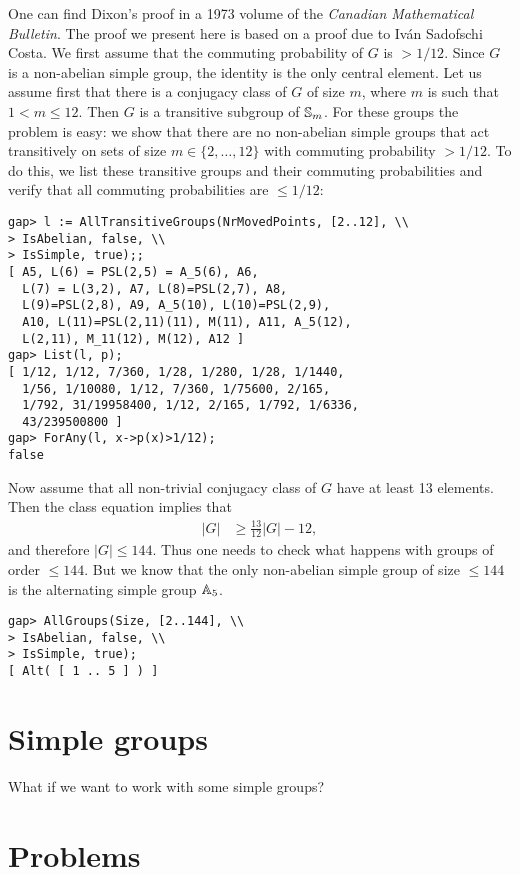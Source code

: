 One can find Dixon's proof in a 1973 volume of the \emph{Canadian Mathematical
Bulletin}. The proof we present here is based on a proof due to Iv\'an Sadofschi
Costa. We first assume that the commuting probability of $G$ is $>1/12$. Since
$G$ is a non-abelian simple group, the identity is the only central element. 
Let us assume first that there is a conjugacy class of $G$ of size $m$, where
$m$ is such that $1<m\leq 12$. Then $G$ is a transitive subgroup of $\mathbb{S}_m$.
For these groups the problem is easy: we show that there are no non-abelian simple groups
that act transitively on sets of size $m\in\{2,\dots,12\}$ with commuting
probability $>1/12$. To do this, we list these transitive groups and their commuting
probabilities and verify that all commuting probabilities are $\leq
1/12$:
\begin{lstlisting}
gap> l := AllTransitiveGroups(NrMovedPoints, [2..12], \\
> IsAbelian, false, \\
> IsSimple, true);;
[ A5, L(6) = PSL(2,5) = A_5(6), A6, 
  L(7) = L(3,2), A7, L(8)=PSL(2,7), A8, 
  L(9)=PSL(2,8), A9, A_5(10), L(10)=PSL(2,9), 
  A10, L(11)=PSL(2,11)(11), M(11), A11, A_5(12), 
  L(2,11), M_11(12), M(12), A12 ]
gap> List(l, p);           
[ 1/12, 1/12, 7/360, 1/28, 1/280, 1/28, 1/1440, 
  1/56, 1/10080, 1/12, 7/360, 1/75600, 2/165, 
  1/792, 31/19958400, 1/12, 2/165, 1/792, 1/6336, 
  43/239500800 ]
gap> ForAny(l, x->p(x)>1/12);
false
\end{lstlisting}

Now assume that all non-trivial conjugacy class of $G$ have at least 13 elements. 
Then the class equation implies that
\begin{align*}
	|G|&\geq \frac{13}{12}|G|-12,
\end{align*}
and therefore $|G|\leq 144$. Thus one needs to check what happens with groups
of order $\leq 144$. 
But we know that the only non-abelian simple group of size
$\leq 144$ is the alternating simple group $\mathbb{A}_5$.
\begin{lstlisting}
gap> AllGroups(Size, [2..144], \\
> IsAbelian, false, \\
> IsSimple, true);
[ Alt( [ 1 .. 5 ] ) ]
\end{lstlisting}

\section{Simple groups}

What if we want to work with some simple groups? 



\section{Problems}


